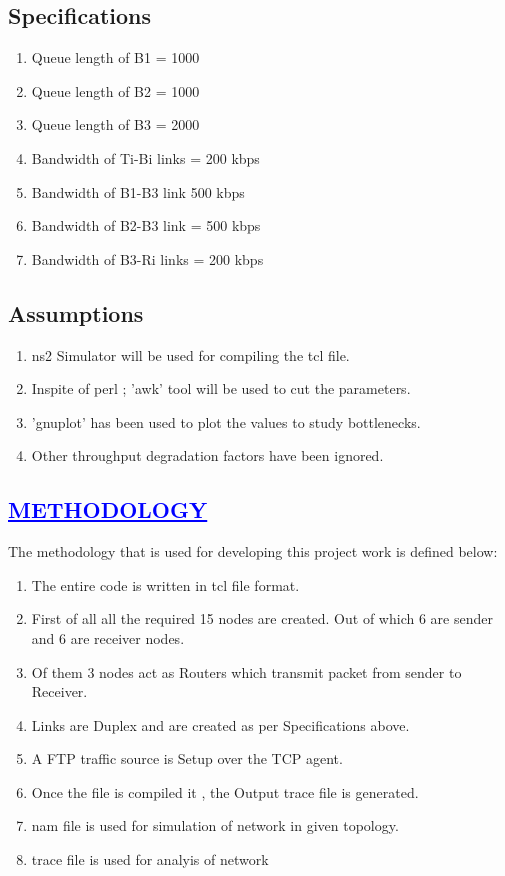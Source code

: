 \documentclass[a4paper,12pt]{report}
\begin{document}
\section*{Specifications}
\begin{enumerate}
 
 \item Queue length of B1 = 1000
 \item Queue length of B2 = 1000 
\item Queue length of B3 = 2000
 \item Bandwidth of Ti-Bi links = 200 kbps
 \item Bandwidth of B1-B3 link  500 kbps
 \item Bandwidth of  B2-B3 link = 500 kbps 
\item Bandwidth of B3-Ri links = 200 kbps

\end{enumerate}

\section*{Assumptions}
\begin{enumerate}
\item ns2 Simulator will be used for compiling the tcl file.
\item Inspite of perl ; 'awk' tool will be used to cut the parameters.
\item 'gnuplot' has been used to plot the values to study bottlenecks.
\item Other throughput degradation factors have been ignored.
\end{enumerate}
 
\begin{center}
\chapter{\textcolor{blue}{\underline {METHODOLOGY}}}
\end{center}
The methodology that is used for developing this project work is defined below:
\begin{enumerate} 
\item The entire code is written in tcl file format.
\item First of all all the required 15 nodes are created. Out of which 6 are sender and 6 are receiver nodes.
\item Of them 3 nodes act as Routers which transmit packet from sender to Receiver.
\item Links are Duplex and are created as per Specifications above.
\item A FTP  traffic source is Setup over the TCP agent.
\item Once the file is compiled it , the Output trace file is generated.
\item nam file is used for simulation of network in given topology.
\item trace file is used for analyis of network
\end{enumerate}
\end{document}
